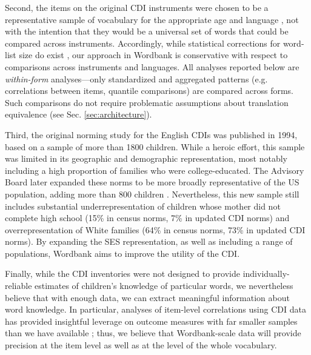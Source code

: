 \documentclass[man,noapacite]{apa2}
\begin{document}
Second, the items on the original CDI instruments were chosen to be a representative sample of vocabulary for the appropriate age and language \cite{fenson1994}, not with the intention that they would be a universal set of words that could be compared across instruments. Accordingly, while statistical corrections for word-list size do exist \cite{mayor2011}, our approach in Wordbank is conservative with respect to comparisons across instruments and languages. All analyses reported below are \emph{within-form} analyses---only standardized and aggregated patterns (e.g. correlations between items, quantile comparisons) are compared across forms. Such comparisons do not require problematic assumptions about translation equivalence (see Sec. \ref{sec:architecture}).

Third, the original norming study for the English CDIs was published in 1994, based on a sample of more than 1800 children. While a heroic effort, this sample was limited in its geographic and demographic representation, most notably including a high proportion of families who were college-educated. The Advisory Board later expanded these norms to be more broadly representative of the US population, adding more than 800 children \cite{fenson2007}. Nevertheless, this new sample still includes substantial underrepresentation of children whose mother did not complete high school (15\% in census norms, 7\% in updated CDI norms) and overrepresentation of White families (64\% in census norms, 73\% in updated CDI norms). By expanding the SES representation, as well as including a range of populations, Wordbank aims to improve the utility of the CDI.

Finally, while the CDI inventories were not designed to provide individually-reliable estimates of children's knowledge of particular words, we nevertheless believe that with enough data, we can extract meaningful information about word knowledge. In particular, analyses of item-level correlations using CDI data has provided insightful leverage on outcome measures with far smaller samples than we have available \cite{hills2009,hills2009b,hills2010,beckage2011}; thus, we believe that Wordbank-scale data will provide precision at the item level as well as at the level of the whole vocabulary.




\end{document}
